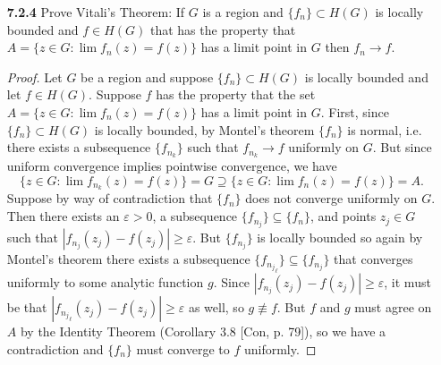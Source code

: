 \documentclass[11pt,oneside,english]{amsart}
\theoremstyle{definition}
\newcommand{\ve}{\varepsilon}
\newcommand{\MB}[1]{\mathbb{#1}}
\begin{document}
\begin{enumerate}[leftmargin=*]
\begin{proof}Let $\{f_n\}$ be a sequence in $C(G,\MB{R})$, suppose it is monotonically increasing in $G$ and that \\ $\lim_{n\to \infty}f_n(z)=f(z)$ for all $z\in G$ where $f\in C(G,\MB{R})$ as well. By Proposition 1.2 [Con, p. 142] there exists a sequence $\{K_k\}\subseteq G$ of compact sets such that $G=\bigcup_{k=1}^\infty K_k$. Fix $k$, consider $\{f_n\}$ and $f$ restricted to $K_k$,  and let $\ve>0$ be given. For each $n$, define $g_n=f-f_n$. Since $f$ and $f_n$ are continuous for every $n$, $g_n$ is also continuous, and since $\{f_n\}$ is monotonically increasing, $\{g_n\}$ is monotonically decreasing to 0 by construction. Thus, for each $z\in K_k$ there exists an $N_z\in \MB{N}$ such that if $n\geq N_z$ then $|g_n(z)-0|=|g_n(z)|<\ve$. Since $g_n$ is continuous, for any $z\in K_k$, there exists an open ball $B(z;r)$ with $r<\infty$ such that if $n\geq N_z$, then for any $w\in B(z;r)$ we have $|g_n(w)|<\ve$. Taking the union over $z\in K_k$ of these open balls yields an open cover of $K_k$, and since $K_k$ is compact, there is a finite set $\{z_1,\ldots,z_m\}\subseteq K_k$ such that $K_k\subseteq \bigcup_{i=1}^m B(z_i;r)$. Now, choose $N=\max\{N_{z_1},N_{z_2},\ldots, N_{z_m}\}$. Then for all $z\in K_k$, if $n\geq N$, $|g_n(z)|=|f_n(z)-f(z)|<\ve$, i.e. $f_n\to f$ on $K_k$. Since this is true for any $k$, by Proposition 1.10(b) and Corollary 1.11 [Con, p. 145] we have that $f_n\to f$ on $G$.
\end{proof}

\item[\textbf{7.2.4}] Prove Vitali's Theorem: If $G$ is a region and $\{f_n\}\subset H(G)$ is locally bounded and $f\in H(G)$ that has the property that $A=\{z\in G:\lim f_n(z)=f(z)\}$ has a limit point in $G$ then $f_n \to f$.

\begin{proof}
Let $G$ be a region and suppose $\{f_n\}\subset H(G)$ is locally bounded and let $f\in H(G)$. Suppose $f$ has the property that the set $A=\{z\in G:\lim f_n(z)=f(z)\}$ has a limit point in $G$. First, since $\{f_n\}\subset H(G)$ is locally bounded, by Montel's theorem $\{f_n\}$ is normal, i.e. there exists a subsequence $\{f_{n_k}\}$ such that $f_{n_k}\to f$ uniformly on $G$. But since uniform convergence implies pointwise convergence, we have 
\[
\{z\in G:\lim f_{n_k}(z)=f(z)\}=G\supseteq \{z\in G:\lim f_n(z)=f(z)\}=A.
\]
Suppose by way of contradiction that $\{f_n\}$ does not converge uniformly on $G$. Then there exists an $\ve>0$, a subsequence $\{f_{n_j}\}\subseteq\{f_n\}$, and points $z_j\in G$ such that $|f_{n_j}(z_j)-f(z_j)|\geq \ve$. But $\{f_{n_j}\}$ is locally bounded so again by Montel's theorem there exists a subsequence $\{f_{{n_j}_\ell}\}\subseteq\{f_{n_j}\}$ that converges uniformly to some analytic function $g$. Since $|f_{n_j}(z_j)-f(z_j)|\geq \ve$, it must be that $|f_{{n_j}_\ell}(z_j)-f(z_j)|\geq \ve$ as well, so $g\not\equiv f$. But $f$ and $g$ must agree on $A$ by the Identity Theorem (Corollary 3.8 [Con, p. 79]), so we have a contradiction and $\{f_n\}$ must converge to $f$ uniformly.


\end{proof}
\end{enumerate}
\end{document}
